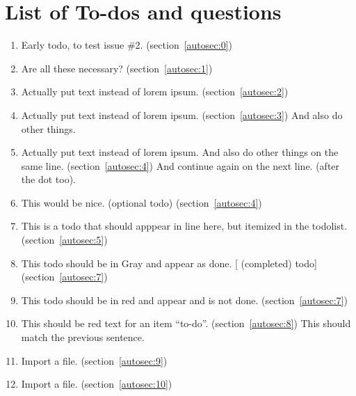\section{List of To-dos and questions}
    \begin{enumerate}[noitemsep]
        \item {\color{red}Early todo, to test issue \#2.} (section~\ref{autosec:0})
        \item {\color{ForestGreen}Are all these necessary?} (section~\ref{autosec:1})
        \item {\color{red}Actually put text instead of lorem ipsum.} (section~\ref{autosec:2})
        \item {\color{red}Actually put text instead of lorem ipsum.} (section~\ref{autosec:3})
{\color{red}And also do other things.}
        \item {\color{red}Actually put text instead of lorem ipsum. And also do other things on the same line.} (section~\ref{autosec:4})
{\color{red}And continue again on the next line. (after the dot too).}
        \item {\color{Orange}This would be nice. (optional todo)} (section~\ref{autosec:4})
        \item {\color{red}This is a todo that should apppear in line here, but itemized in the todolist.} (section~\ref{autosec:5})
        \item {\color{Gray}This todo should be in Gray and appear as done. [ (completed) todo]} (section~\ref{autosec:7})
        \item {\color{red}This todo should be in red and appear and is not done.} (section~\ref{autosec:7})
        \item {\color{red}This should be red text for an item ``to-do''.} (section~\ref{autosec:8})
{\color{red}This should match the previous sentence.}
        \item {\color{red}Import a file.} (section~\ref{autosec:9})
        \item {\color{red}Import a file.} (section~\ref{autosec:10})
    \end{enumerate}

